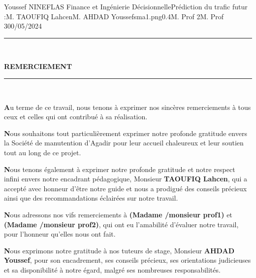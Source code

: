 \documentclass[11pt]{article}
\begin{document}
{Youssef NINEFLAS} {Finance et Ingénierie Décisionnelle}{Prédiction du trafic futur :}{M. TAOUFIQ Lahcen}{M. AHDAD Youssef}{sma1.png}{0.4}{M. Prof 2}{M. Prof 3}{00/05/2024}

\newpage




\begin{center}
    {\color{cyan}\rule{\linewidth}{0.5mm}} \\[1.5ex]
    
    {\color{cyan}\Huge\bfseries REMERCIEMENT\par}
    
    {\color{cyan}\rule{\linewidth}{0.5mm}} \\[2ex]
    
\end{center}

\vspace{1cm}

\textbf{A}u terme de ce travail, nous tenons à exprimer nos sincères remerciements à tous ceux et celles qui ont contribué à sa réalisation.\vspace{0.5cm}


\textbf{N}ous souhaitons tout particulièrement exprimer notre profonde gratitude envers la Société de manutention d’Agadir pour leur accueil chaleureux et leur soutien tout au long de ce projet.\vspace{0.5cm}

\textbf{N}ous tenons également à exprimer notre profonde gratitude et notre respect infini envers notre encadrant pédagogique, Monsieur \textbf{TAOUFIQ Lahcen}, qui a accepté avec honneur d'être notre guide et nous a prodigué des conseils précieux ainsi que des recommandations éclairées sur notre travail.\vspace{0.5cm}

\textbf{N}ous adressons nos vifs remerciements à \textbf{(Madame /monsieur prof1)} et\textbf{ (Madame /monsieur prof2)}, qui ont eu l'amabilité d'évaluer notre travail, pour l'honneur qu'elles nous ont fait.\vspace{0.5cm}

\textbf{N}ous exprimons notre gratitude à nos tuteurs de stage, Monsieur\textbf{ AHDAD Youssef}, pour son encadrement, ses conseils précieux, ses orientations judicieuses et sa disponibilité à notre égard, malgré ses nombreuses responsabilités.\vspace{0.5cm}
\end{document}
